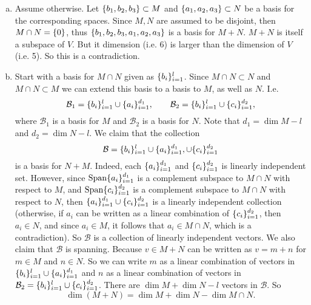 \begin{problem}
	\begin{solution}
		\begin{enumerate}[(a)]
			\item Assume otherwise. Let $ \{b_1,b_2,b_3\} \subset M $ and $ \{a_1,a_2,a_3\} \subset N $ be a basis for the corresponding spaces. Since $ M,N $ are assumed to be disjoint, then $ M \cap N = \{0\} $, thus $ \{b_1,b_2,b_3,a_1,a_2,a_3\} $ is a basis for $ M+N $. $ M+N $ is itself a subspace of $ V $. But it dimension (i.e. 6) is larger than the dimension of $ V $ (i.e. 5). So this is a contradiction.
			
			\item Start with a basis for $ M\cap N $ given as $ \{b_i\}_{i=1}^l $. Since $ M\cap N \subset N $ and $ M\cap N \subset M $ we can extend this basis to a basis to $ M $, as well as $ N $. I.e.
			\[ \mathcal{B}_1 = \{b_i\}_{i=1}^l \cup \{a_i\}_{i=1}^{d_1}, \qquad \mathcal{B}_2 = \{b_i\}_{i=1}^l \cup \{c_i\}_{i=1}^{d_2}, \]
			where $ \mathcal{B}_1 $ is a basis for $ M $ and $ \mathcal{B}_2 $ is a basis for $ N $. Note that $ d_1 = \dim M - l $ and $ d_2 = \dim N - l $. We claim that the collection
			\[ \mathcal{B} = \{b_i\}_{i=1}^l \cup \{a_i\}_{i=1}^{d_1}, \cup \{c_i\}_{i=1}^{d_2} \]
			is a basis for $ N + M $. Indeed, each $ \{a_i\}_{i=1}^{d_1} $ and $ \{c_i\}_{i=1}^{d_2} $ is linearly independent set. However, since $ \operatorname{Span} \{a_i\}_{i=1}^{d_1}  $ is a complement subspace to $ M\cap N $ with respect to $ M $, and $ \operatorname{Span} \{c_i\}_{i=1}^{d_2}  $ is a complement subspace to $ M\cap N $ with respect to $ N $, then $ \{a_i\}_{i=1}^{d_1}  \cup  \{c_i\}_{i=1}^{d_2}  $ is a linearly independent collection (otherwise, if $ a_i $ can be written as a linear combination of $ \{c_i\}_{i=1}^{d_2} $, then $ a_i \in N $, and since $ a_i \in M $, it follows that $ a_i \in M\cap N $, which is a contradiction). So $ \mathcal{B} $ is a collection of linearly independent vectors. We also claim that $ \mathcal{B} $ is spanning. Because $ v \in M + N $ can be written as $ v = m + n $ for $ m \in M $ and $ n \in N $. So we can write $ m $ as a linear combination of vectors in $  \{b_i\}_{i=1}^l \cup \{a_i\}_{i=1}^{d_1} $ and $ n $ as a linear combination of vectors in $ \mathcal{B}_2 = \{b_i\}_{i=1}^l \cup \{c_i\}_{i=1}^{d_2} $. There are $ \dim M + \dim N - l $ vectors in $ \mathcal{B} $. So 
			\[ \dim (M+N) = \dim M + \dim N - \dim M\cap N. \]
		\end{enumerate}
	\end{solution}
\end{problem}

